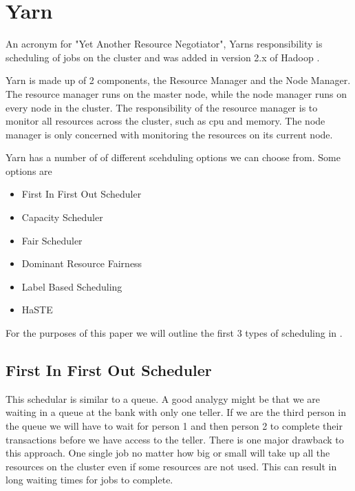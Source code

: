 \section{Yarn}

An acronym for "Yet Another Resource Negotiator", Yarns responsibility is scheduling of jobs on the cluster and was added in version 2.x of Hadoop \cite[pg.1]{yarn-scheduling}.

Yarn is made up of 2 components, the Resource Manager and the Node Manager. The resource manager runs on the master node, while the node manager runs on every node in the cluster. The responsibility of the resource manager is to monitor all resources across the cluster, such as cpu and memory. The node manager is only concerned with monitoring the resources on its current node.

Yarn has a number of of different scehduling options we can choose from. Some options are \cite[pg.2]{yarn-scheduling}

\begin{itemize}
\item First In First Out Scheduler 
\item Capacity Scheduler
\item Fair Scheduler 
\item Dominant Resource Fairness
\item Label Based Scheduling
\item HaSTE
\end{itemize}

For the purposes of this paper we will outline the first 3 types of scheduling in .

\subsection{First In First Out Scheduler}

This schedular is similar to a queue. A good analygy might be that we are waiting in a queue at the bank with only one teller. If we are the third person in the queue we will have to wait for person 1 and then person 2 to complete their transactions before we have access to the teller. 
There is one major drawback to this approach. One single job no matter how big or small will take up all the resources on the cluster even if some resources are not used. This can result in long waiting times for jobs to complete.


